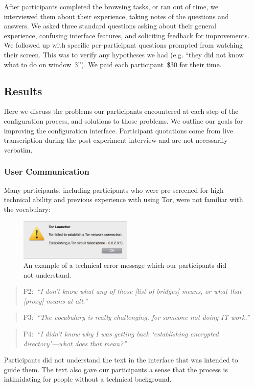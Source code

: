 \documentclass[USenglish,oneside,twocolumn]{article}
\newcommand{\pquote}[2]{
\begin{quotation}
\noindent #1:~\textit{``#2''}
\end{quotation}
}
\begin{document}
After participants completed the browsing tasks, or ran out of time,
we interviewed them about their experience,
taking notes of the questions and answers.
We asked three standard questions asking about their general experience, 
confusing interface features, and soliciting feedback for improvements. We followed up
with specific per-participant questions prompted from watching their screen. 
This was to verify any hypotheses we had (e.g. ``they did not know what to do on window~3'').
We paid each participant~\$30 for their time. 

\subsection{Results} 
Here we discuss the problems our participants encountered at each step of the configuration process, and solutions to those problems.
We outline our goals for improving the configuration interface.
Participant quotations come from live transcription during the post-experiment interview
and are not necessarily verbatim.

\subsubsection{User Communication} 
Many participants, including participants who were pre-screened for high technical ability and previous experience with using Tor, were not familiar with the vocabulary:

\begin{figure}[t]
  \centering
    \includegraphics[width=0.5\textwidth]{error.png}
    \caption{An example of a technical error message which our participants did not understand.}
\label{fig:error}
\end{figure}

\pquote{P2}{I don't know what any of those [list of bridges] means, or what that [proxy] means at all.}
\pquote{P3}{The vocabulary is really challenging, for someone not doing IT work.}
\pquote{P4}{I didn't know why I was getting back `establishing encrypted directory'---what does that mean?}
Participants did not understand the text in the interface that was intended to guide them. The text also gave our participants a sense that the process is intimidating for people without a technical background. 
\end{document}
